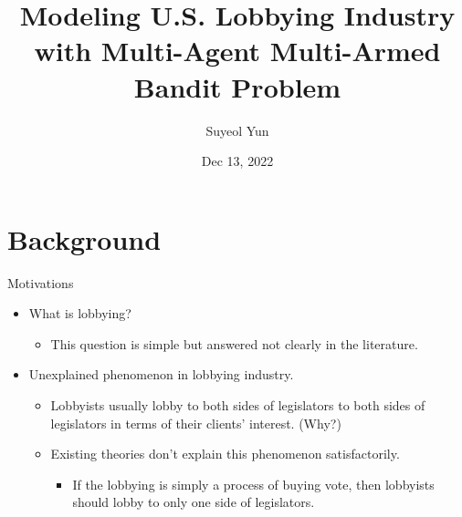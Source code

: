 \documentclass{beamer}
\begin{document}
	\title[]{Modeling U.S. Lobbying Industry with Multi-Agent Multi-Armed Bandit Problem}
	\author[Suyeol Yun]{Suyeol Yun}
	\date{Dec 13, 2022}
	\frame{\titlepage}
	\section{Background}

	\begin{frame}{Motivations}
		\fontsize{13pt}{12pt}
		\begin{itemize}
			\item What is lobbying?
			\begin{itemize}
				\item This question is simple but answered not clearly in the literature.
			\end{itemize}
		\end{itemize}
		\begin{itemize}
			\item Unexplained phenomenon in lobbying industry. 
			\begin{itemize}
				\item Lobbyists usually lobby to both sides of legislators to both sides of legislators 
				in terms of their clients' interest. (Why?)
				\item Existing theories don't explain this phenomenon satisfactorily.
				\begin{itemize}
					\item If the lobbying is simply a process of buying vote, 
					then lobbyists should lobby to only one side of legislators.
				\end{itemize}
				\end{itemize}
		\end{itemize}
	\end{frame}
\end{document}
